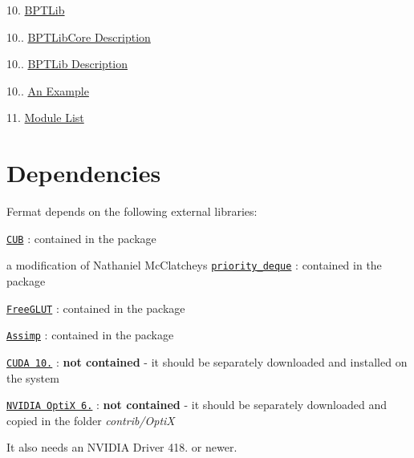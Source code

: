 \begin{DoxyParagraph}{}
\begin{DoxyItemize}
\item 10. \hyperlink{_b_p_t_lib_page}{B\+P\+T\+Lib} 
\begin{DoxyItemize}
\item 10.. \hyperlink{_b_p_t_lib_page_BPTLibCoreSection}{B\+P\+T\+Lib\+Core Description} 
\item 10.. \hyperlink{_b_p_t_lib_page_BPTLibSection}{B\+P\+T\+Lib Description} 
\item 10.. \hyperlink{_b_p_t_lib_page_BPTExampleSection}{An Example} 
\end{DoxyItemize}
\item 11. \hyperlink{_modules_page}{Module List} 
\end{DoxyItemize}
\end{DoxyParagraph}
\hypertarget{index_FermatDependenciesSection}{}\section{Dependencies}\label{index_FermatDependenciesSection}
\begin{DoxyParagraph}{}
Fermat depends on the following external libraries\+: ~\newline

\begin{DoxyItemize}
\item \href{http://nvlabs.github.io/cub/}{\tt C\+UB} \+: contained in the package
\item a modification of Nathaniel Mc\+Clatchey\textquotesingle{}s \href{https://github.com/nmcclatchey/Priority-Deque/}{\tt priority\+\_\+deque} \+: contained in the package
\item \href{http://freeglut.sourceforge.net/}{\tt Free\+G\+L\+UT} \+: contained in the package
\item \href{http://assimp.org/}{\tt Assimp} \+: contained in the package
\item \href{https://developer.nvidia.com/cuda-80-ga2-download-archive}{\tt C\+U\+DA 10.} \+: {\bfseries not contained} -\/ it should be separately downloaded and installed on the system
\item \href{https://developer.nvidia.com/optix}{\tt N\+V\+I\+D\+IA OptiX 6.} \+: {\bfseries not contained} -\/ it should be separately downloaded and copied in the folder {\itshape contrib/\+OptiX}
\end{DoxyItemize}
\end{DoxyParagraph}
\begin{DoxyParagraph}{}
It also needs an N\+V\+I\+D\+IA Driver 418. or newer.
\end{DoxyParagraph}
